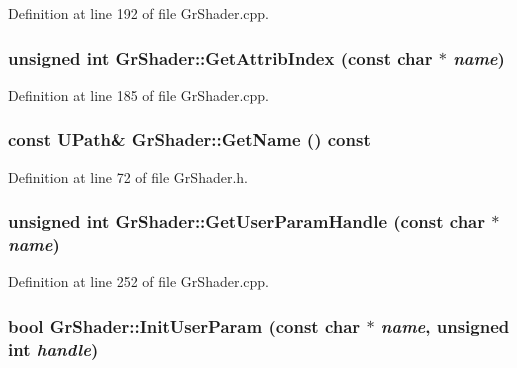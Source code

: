 \begin{CompactItemize}
Definition at line 192 of file GrShader.cpp.\hypertarget{class_gr_shader_94d6c2ccfc6e5b98ed4fee018308b5cb}{
\subsubsection[{GetAttribIndex}]{\setlength{\rightskip}{0pt plus 5cm}unsigned int GrShader::GetAttribIndex (const char $\ast$ {\em name})}}
\label{class_gr_shader_94d6c2ccfc6e5b98ed4fee018308b5cb}




Definition at line 185 of file GrShader.cpp.\hypertarget{class_gr_shader_adfcd8e36a3b4d3b12fc77b009c6f1c6}{
\subsubsection[{GetName}]{\setlength{\rightskip}{0pt plus 5cm}const {\bf UPath}\& GrShader::GetName () const}}
\label{class_gr_shader_adfcd8e36a3b4d3b12fc77b009c6f1c6}




Definition at line 72 of file GrShader.h.\hypertarget{class_gr_shader_43d8fd833e55e423dc8ac3d49ccc36ba}{
\subsubsection[{GetUserParamHandle}]{\setlength{\rightskip}{0pt plus 5cm}unsigned int GrShader::GetUserParamHandle (const char $\ast$ {\em name})}}
\label{class_gr_shader_43d8fd833e55e423dc8ac3d49ccc36ba}




Definition at line 252 of file GrShader.cpp.\hypertarget{class_gr_shader_e95cb134961fe00f4c4cd59e52d2d136}{
\subsubsection[{InitUserParam}]{\setlength{\rightskip}{0pt plus 5cm}bool GrShader::InitUserParam (const char $\ast$ {\em name}, \/  unsigned int {\em handle})}}
\label{class_gr_shader_e95cb134961fe00f4c4cd59e52d2d136}





\end{CompactItemize}
